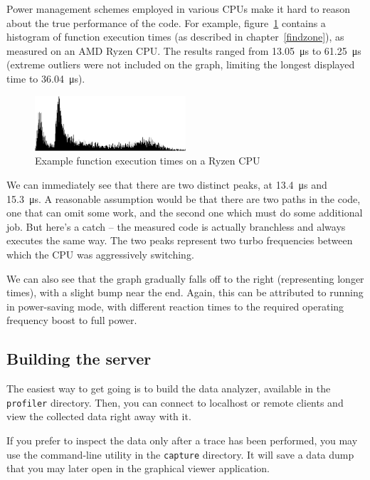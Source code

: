 \documentclass[hidelinks,titlepage,a4paper]{article}
\begin{document}
Power management schemes employed in various CPUs make it hard to reason about the true performance of the code. For example, figure~\ref{ryzenimage} contains a histogram of function execution times (as described in chapter~\ref{findzone}), as measured on an AMD Ryzen CPU. The results ranged from 13.05~\si{\micro\second} to 61.25~\si{\micro\second} (extreme outliers were not included on the graph, limiting the longest displayed time to 36.04~\si{\micro\second}).

\begin{figure}[h]
\centering
\includegraphics[width=0.5\textwidth]{images/ryzen.png}
\caption{Example function execution times on a Ryzen CPU}
\label{ryzenimage}
\end{figure}

We can immediately see that there are two distinct peaks, at 13.4~\si{\micro\second} and 15.3~\si{\micro\second}. A reasonable assumption would be that there are two paths in the code, one that can omit some work, and the second one which must do some additional job. But here's a catch -- the measured code is actually branchless and always executes the same way. The two peaks represent two turbo frequencies between which the CPU was aggressively switching.

We can also see that the graph gradually falls off to the right (representing longer times), with a slight bump near the end. Again, this can be attributed to running in power-saving mode, with different reaction times to the required operating frequency boost to full power.

\subsection{Building the server}
\label{buildingserver}

The easiest way to get going is to build the data analyzer, available in the \texttt{profiler} directory. Then, you can connect to localhost or remote clients and view the collected data right away with it.

If you prefer to inspect the data only after a trace has been performed, you may use the command-line utility in the \texttt{capture} directory. It will save a data dump that you may later open in the graphical viewer application.
\end{document}
